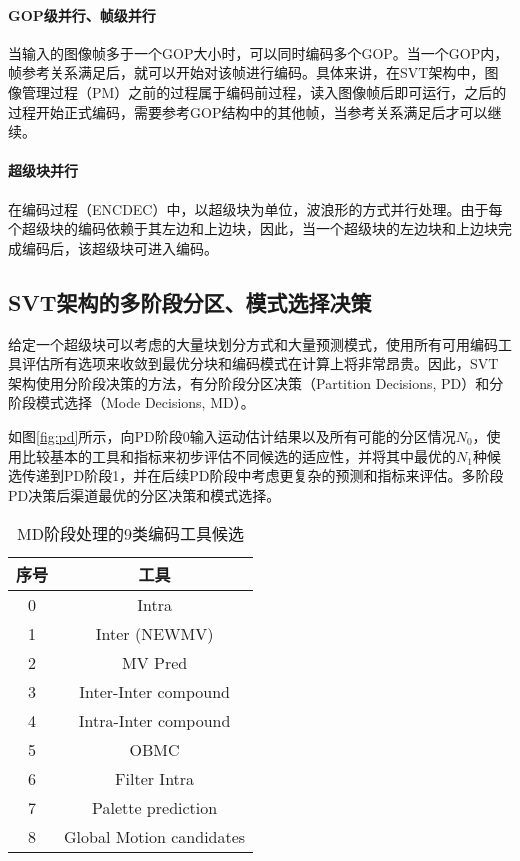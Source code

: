   \paragraph{GOP级并行、帧级并行} 当输入的图像帧多于一个GOP大小时，可以同时编码多个GOP。当一个GOP内，帧参考关系满足后，就可以开始对该帧进行编码。具体来讲，在SVT架构中，图像管理过程（PM）之前的过程属于编码前过程，读入图像帧后即可运行，之后的过程开始正式编码，需要参考GOP结构中的其他帧，当参考关系满足后才可以继续。
  \paragraph{超级块并行} 在编码过程（ENCDEC）中，以超级块为单位，波浪形的方式并行处理。由于每个超级块的编码依赖于其左边和上边块，因此，当一个超级块的左边块和上边块完成编码后，该超级块可进入编码。

  \subsection{SVT架构的多阶段分区、模式选择决策\cite{EncoderDesignSVTAV1}} \label{sec:pd-md}
  给定一个超级块可以考虑的大量块划分方式和大量预测模式，使用所有可用编码工具评估所有选项来收敛到最优分块和编码模式在计算上将非常昂贵。因此，SVT架构使用分阶段决策的方法，有分阶段分区决策（Partition Decisions, PD）和分阶段模式选择（Mode Decisions, MD）。

  如图\ref{fig:pd}所示，向PD阶段0输入运动估计结果以及所有可能的分区情况$N_0$，使用比较基本的工具和指标来初步评估不同候选的适应性，并将其中最优的$N_1$种候选传递到PD阶段1，并在后续PD阶段中考虑更复杂的预测和指标来评估。多阶段PD决策后渠道最优的分区决策和模式选择。

  \begin{table}[!hpt]
    \renewcommand{\arraystretch}{0.8}
    \caption{MD阶段处理的9类编码工具候选}
    \label{tab:av1-classes}
    \centering
    \begin{tabular}{cc} \toprule
      序号    & 工具 \\ \midrule
      0& Intra \\
      1& Inter (NEWMV) \\
      2& MV Pred  \\
      3& Inter-Inter compound \\
      4& Intra-Inter compound \\
      5& OBMC \\
      6& Filter Intra \\
      7& Palette prediction \\
      8& Global Motion candidates \\\bottomrule
    \end{tabular}
  \end{table}

